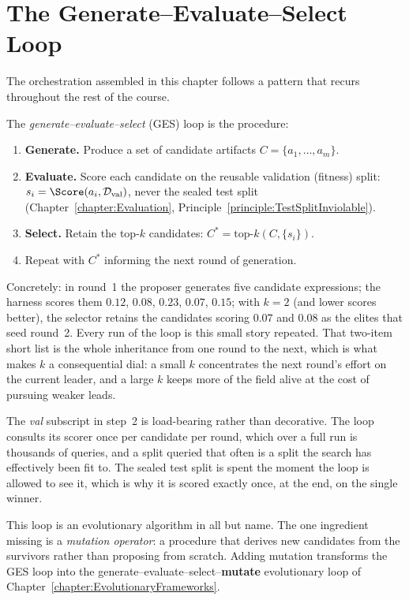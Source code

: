 \section{The Generate--Evaluate--Select Loop}
\label{section:GenEvalSel}

The orchestration assembled in this chapter follows a pattern that recurs throughout the rest of the course.

\begin{definition}
\label{definition:GenEvalSel}
The \emph{generate–evaluate–select} (GES) loop is the procedure:
\begin{enumerate}
\item \textbf{Generate.} Produce a set of candidate artifacts $C = \{a_1, \ldots, a_m\}$.
\item \textbf{Evaluate.} Score each candidate on the reusable validation (fitness) split: $s_i = \Score(a_i, \mathcal{D}_{\mathrm{val}})$, never the sealed test split (Chapter~\ref{chapter:Evaluation}, Principle~\ref{principle:TestSplitInviolable}).
\item \textbf{Select.} Retain the top-$k$ candidates: $C^* = \mathrm{top\text{-}}k(C, \{s_i\})$.
\item Repeat with $C^*$ informing the next round of generation.
\end{enumerate}
\end{definition}

Concretely: in round~1 the proposer generates five candidate expressions; the harness scores them $0.12$, $0.08$, $0.23$, $0.07$, $0.15$; with $k=2$ (and lower scores better), the selector retains the candidates scoring $0.07$ and $0.08$ as the elites that seed round~2.
Every run of the loop is this small story repeated.
That two-item short list is the whole inheritance from one round to the next, which is what makes $k$ a consequential dial: a small $k$ concentrates the next round's effort on the current leader, and a large $k$ keeps more of the field alive at the cost of pursuing weaker leads.

The \emph{val} subscript in step~2 is load-bearing rather than decorative.
The loop consults its scorer once per candidate per round, which over a full run is thousands of queries, and a split queried that often is a split the search has effectively been fit to.
The sealed test split is spent the moment the loop is allowed to see it, which is why it is scored exactly once, at the end, on the single winner.

This loop is an evolutionary algorithm in all but name.
The one ingredient missing is a \emph{mutation operator}: a procedure that derives new candidates from the survivors rather than proposing from scratch.
Adding mutation transforms the GES loop into the generate--evaluate--select--\textbf{mutate} evolutionary loop of Chapter~\ref{chapter:EvolutionaryFrameworks}.

